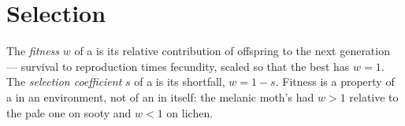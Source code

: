\section{Selection}

\begin{definition}[Fitness]\label{def:b2:population-genetics:fitness}
The \emph{fitness} $w$ of a  is its relative contribution
of offspring to the next generation --- survival to reproduction
times fecundity, scaled so that the best  has $w = 1$. The
\emph{selection coefficient} $s$ of a  is its shortfall,
$w = 1 - s$. Fitness is a property of a  in an environment,
not of an  in itself: the melanic moth's  had $w > 1$
relative to the pale one on sooty  and $w < 1$ on lichen.
\end{definition}

